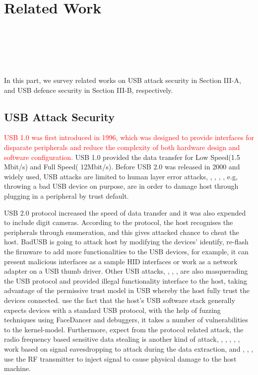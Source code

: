 \section{Related Work}
\label{sec:related_work}
\\
\\
\\
\\
\\

In this part, we survey related works on USB attack security in Section III-A, and USB defence security in Section III-B, respectively.
\subsection{USB Attack Security}
\textcolor{red}{USB 1.0\cite{usb01} was first introduced in 1996, which was designed to provide interfaces for disparate peripherals and reduce the complexity of both hardware design and software configuration\cite{sok}.} USB 1.0 provided the data transfer for Low Speed(1.5 Mbit/s) and Full Speed( 12Mbit/s). Before USB 2.0 was released in 2000 and widely used, USB attacks are limited to human layer error attacks, \cite{se}, \cite{goverment}, \cite{atkvec}, \cite{ueerreallydo}, e.g, throwing a bad USB device on purpose, are in order to damage host through plugging in a peripheral by trust default. 

USB 2.0 protocol increased the speed of data transfer and it was also expended to include digit cameras. According to the protocol, the host recognises the peripherals through enumeration, and this gives attacked chance to cheat the host. BadUSB\cite{badusb} is going to attack host by modifying the devices' identify, re-flash the firmware to add more functionalities to the USB devices, for example, it can present malicious interfaces as a sample HID interfaces or work as a network adapter on a USB thumb driver. Other USB attacks, \cite{rubber}, \cite{usbdriver}, \cite{usbbypassing}, \cite{iseeyou} are also masquerading the USB protocol and provided illegal functionality interface to the host, taking advantage of the permissive trust model in USB whereby the host fully trust the devices connected. \cite{syzkaller} use the fact that the host's USB software stack generally expects devices with a standard USB protocol, with the help of fuzzing techniques using FaceDancer \cite{facedancer} and debuggers, it takes a number of vulnerabilities to the kernel-model. Furthermore, expect from the protocol related attack, the radio frequency based sensitive data stealing is another kind of attack, \cite{smartphone} , \cite{poweremi}, \cite{badusbhub}, \cite{usbfinger}, \cite{side}, \cite{usbdriver} work based on signal eavesdropping to attack during the data extraction, and \cite{usbkiller}, \cite{cable}, \cite{usbee}, \cite{turnip} use the RF transmitter to inject signal to cause physical damage to the host machine.    

